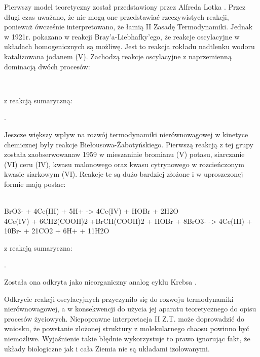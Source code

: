 \documentclass[10pt, a4paper, twoside, onecolumn]{article}
\numberwithin{equation}{section}
\begin{document}
	\par
	Pierwszy model teoretyczny został przedstawiony przez Alfreda Lotka \cite{lotka}. Przez długi czas uważano, że nie mogą one przedstawiać rzeczywistych reakcji, ponieważ ówcześnie interpretowano, że łamią II Zasadę Termodynamiki. Jednak w 1921r. pokazano w reakcji Bray'a-Liebhafky'ego, że reakcje oscylacyjne w układach homogenicznych są możliwę. Jest to reakcja rokładu nadtlenku wodoru katalizowana jodanem (V). Zachodzą reakcje oscylacyjne z naprzemienną dominacją dwóch procesów: \cite{orlik}
	\begin{center}
		 \\
	\end{center}
	z reakcją sumaryczną: 
	\begin{center}
		.
	\end{center}
	Jeszcze większy wpływ na rozwój termodynamiki nierównowagowej w kinetyce chemicznej były reakcje Biełousowa-Żabotyńskiego. Pierwszą reakcją z tej grupy została zaobserwowanaw 1959 w mieszaninie bromianu (V) potasu, siarczanie (VI) ceru (IV), kwasu malonowego oraz kwasu cytrynowego w rozcieńczonym kwasie siarkowym (VI). Reakcje te są dużo bardziej złożone i w uproszczonej formie mają postac: \cite{orlik}
	\begin{center}
		 \\
		BrO3- + 4Ce(III) + 5H+ -> 4Ce(IV) + HOBr + 2H2O \\
		4Ce(IV) + 6CH2(COOH)2 +BrCH(COOH)2 + HOBr + 8BrO3- -> 4Ce(III) + 10Br- + 21CO2 + 6H+ + 11H2O
	\end{center}
	z reakcją sumaryczna: 
	\begin{center}
		.
	\end{center}
	Została ona odkryta jako nieorganiczny analog cyklu Krebsa \cite{belousov_hist}. \par
	Odkrycie reakcji oscylacyjnych przyczyniło się do rozwoju termodynamiki nierównowagowej, a w konsekwencji do użycia jej aparatu teoretycznego do opisu procesów życiowych. Niepoprawne interpretacja II Z.T. może doprowadzić do wniosku, że powstanie złożonej struktury z molekularnego chaosu powinno być niemożliwe. Wyjaśnienie takie błędnie wykorzystuje to prawo ignorując fakt, że układy biologiczne jak i cała Ziemia nie są układami izolowanymi. 
	
\end{document}
